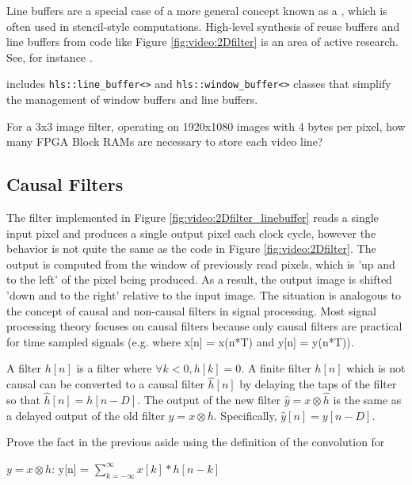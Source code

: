 \begin{aside}
Line buffers are a special case of a more general concept known as a , which is often used in stencil-style computations.  High-level synthesis of reuse buffers and line buffers from code like Figure \ref{fig:video:2Dfilter} is an area of active research.  See, for instance \cite{bayliss12sdram}\cite{hegarty2016rigel}.
\end{aside}
\begin{aside}
\VHLS includes \lstinline|hls::line_buffer<>| and \lstinline|hls::window_buffer<>| classes that simplify the management of window buffers and line buffers.  
\end{aside}

\begin{exercise}
For a 3x3 image filter, operating on 1920x1080 images with 4 bytes per pixel, how many FPGA Block RAMs are necessary to store each video line?
\end{exercise}

\subsection{Causal Filters}

The filter implemented in Figure \ref{fig:video:2Dfilter_linebuffer} reads a single input pixel and produces a single output pixel each clock cycle, however the behavior is not quite the same as the code in Figure \ref{fig:video:2Dfilter}.  The output is computed from the window of previously read pixels, which is 'up and to the left' of the pixel being produced. As a result, the output image is shifted 'down and to the right' relative to the input image.  The situation is analogous to the concept of causal and non-causal filters in signal processing.  Most signal processing theory focuses on causal filters because only causal filters are practical for time sampled signals (e.g. where x[n] = x(n*T) and y[n] = y(n*T)).

\begin{aside}
A  filter $h[n]$ is a filter where $\forall k < 0, h[k] = 0$.
A finite filter $h[n]$ which is not causal can be converted to a causal filter $\hat{h}[n]$ by delaying the taps of the filter so that $\hat{h}[n] = h[n-D]$. The output of the new filter $\hat{y} = x \otimes \hat{h}$ is the same as a delayed output of the old filter $y = x \otimes h$.  Specifically,  $\hat{y}[n] = y[n-D]$.
\end{aside}

\begin{exercise}
Prove the fact in the previous aside using the definition of the convolution for

$y = x \otimes h$: y[n] = $\sum\limits_{k=-\infty}^\infty x[k] *h[n-k]$
\end{exercise}

